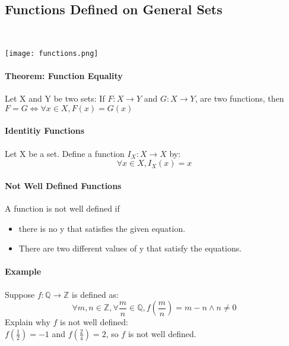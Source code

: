 \subsection*{Functions Defined on General Sets}
\hrulefill\\

\begin{center}
    \texttt{[image: functions.png]}
\end{center}

\paragraph*{Theorem: Function Equality}
Let X and Y be two sets: If $F: X \rightarrow Y$ and $G: X \rightarrow Y$, are two functions, then 
$F = G \iff \forall x \in X, F(x) = G(x)$

\paragraph*{Identitiy Functions}
Let X be a set. Define a function $I_X: X \rightarrow X$ by:
\begin{equation*}
    \forall x \in X, I_X(x) = x
\end{equation*}

\paragraph*{Not Well Defined Functions}
A function is not well defined if 
\begin{itemize}
    \item there is no y that satisfies the given equation.
    \item There are two different values of y that satisfy the equations.
\end{itemize}

\paragraph*{Example}
Suppose $f: \mathbb{Q} \rightarrow \mathbb{Z}$ is defined as:
\begin{equation*}
    \forall m,n \in \mathbb{Z}, \forall \frac{m}{n} \in \mathbb{Q}, f(\frac{m}{n}) = m - n \land n \neq 0
\end{equation*}
Explain why $f$ is not well defined:\\
$f(\frac{1}{2}) = -1$ and $f(\frac{2}{4}) = 2$, so $f$ is not well defined.
